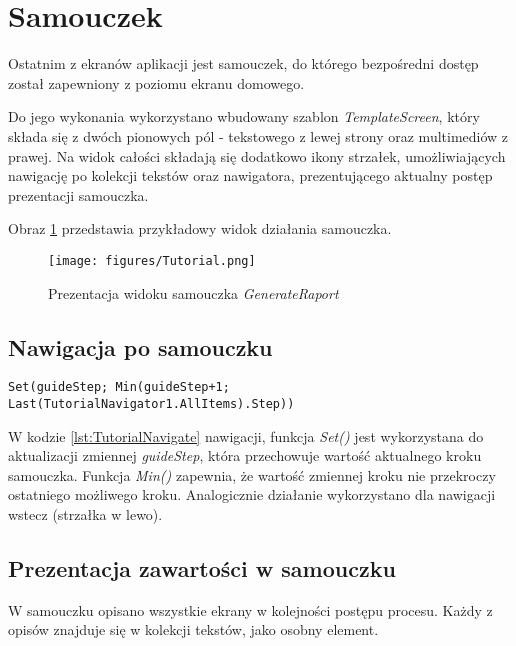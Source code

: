 \section{Samouczek}

Ostatnim z ekranów aplikacji jest samouczek, do którego bezpośredni dostęp został zapewniony z poziomu ekranu domowego.

Do jego wykonania wykorzystano wbudowany szablon \emph{TemplateScreen}, który składa się z dwóch pionowych pól - tekstowego z lewej strony oraz multimediów z prawej. Na widok całości składają się dodatkowo ikony strzałek, umożliwiających nawigację po kolekcji tekstów oraz nawigatora, prezentującego aktualny postęp prezentacji samouczka.

Obraz \ref{fig:tutorial} przedstawia przykładowy widok działania samouczka.

\begin{figure}[H]
    \centering
    \texttt{[image: figures/Tutorial.png]}
    \caption{Prezentacja widoku samouczka \emph{GenerateRaport}}
    \label{fig:tutorial}
\end{figure}

\subsection{Nawigacja po samouczku}

\begin{lstlisting}[language=PowerFx]
Set(guideStep; Min(guideStep+1; Last(TutorialNavigator1.AllItems).Step))
\end{lstlisting}

W kodzie \ref{lst:TutorialNavigate} nawigacji, funkcja \emph{Set()} jest wykorzystana do aktualizacji zmiennej \emph{guideStep}, która przechowuje wartość aktualnego kroku samouczka. Funkcja \emph{Min()} zapewnia, że wartość zmiennej kroku nie przekroczy ostatniego możliwego kroku.  Analogicznie działanie wykorzystano dla nawigacji wstecz (strzałka w lewo).

\subsection{Prezentacja zawartości w samouczku}

W samouczku opisano wszystkie ekrany w kolejności postępu procesu. Każdy z opisów znajduje się w kolekcji tekstów, jako osobny element.

